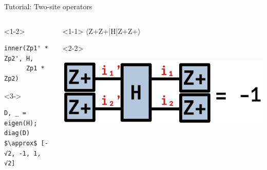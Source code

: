 \begin{frame}[fragile]{Tutorial: Two-site operators}

\begin{columns}

\begin{column}{5cm}

\begin{onlyenv}<1-2>
\begin{lstlisting}[language=JuliaLocal, style=julia, basicstyle=\scriptsize\ttfamily]
inner(Zp1' * Zp2', H,
      Zp1 * Zp2)
\end{lstlisting}
\end{onlyenv}

\begin{onlyenv}<3->
\begin{lstlisting}[language=JuliaLocal, style=julia, mathescape, basicstyle=\scriptsize\ttfamily]
D, _ = eigen(H);
diag(D) $\approx$ [-√2, -1, 1, √2]
\end{lstlisting}
\end{onlyenv}

\end{column}

\begin{column}{5cm}

\begin{onlyenv}<1-1>
$\langle$Z+Z+|H|Z+Z+$\rangle$ \\
\end{onlyenv}

\begin{onlyenv}<2-2>
\vspace*{0.0cm}
\begin{center}
\includegraphics[width=1.0\textwidth]{
  slides/assets/Zp1Zp2HZp1Zp2.png
}
\end{center}
\vspace*{0.0cm}
\end{onlyenv}



\end{column}
\end{columns}
\end{frame}
